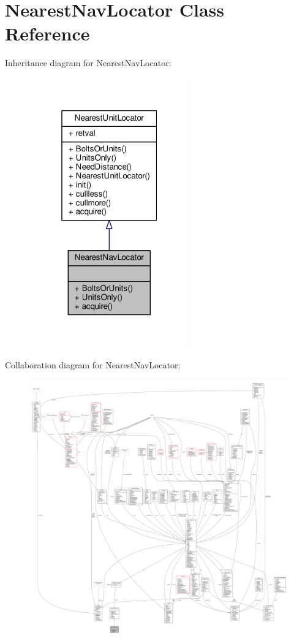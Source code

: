\hypertarget{classNearestNavLocator}{}\section{Nearest\+Nav\+Locator Class Reference}
\label{classNearestNavLocator}


Inheritance diagram for Nearest\+Nav\+Locator\+:
\nopagebreak
\begin{figure}[H]
\begin{center}
\leavevmode
\includegraphics[width=196pt]{d4/d5a/classNearestNavLocator__inherit__graph}
\end{center}
\end{figure}


Collaboration diagram for Nearest\+Nav\+Locator\+:
\nopagebreak
\begin{figure}[H]
\begin{center}
\leavevmode
\includegraphics[width=350pt]{d9/d76/classNearestNavLocator__coll__graph}
\end{center}
\end{figure}
